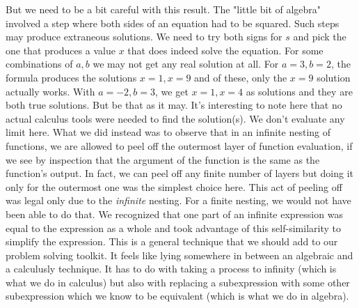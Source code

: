 But we need to be a bit careful with this result. The "little bit of algebra" involved a step where both sides of an equation had to be squared. Such steps may produce extraneous solutions. We need to try both signs for $s$ and pick the one that produces a value $x$ that does indeed solve the equation. For some combinations of $a,b$ we may not get any real solution at all. For $a = 3, b = 2$, the formula produces the solutions $x = 1, x = 9$ and of these, only the $x=9$ solution actually works. With $a = -2, b = 3$, we get $x = 1, x = 4$ as solutions and they are both true solutions. But be that as it may. It's interesting to note here that no actual calculus tools were needed to find the solution(s). We don't evaluate any limit here. What we did instead was to observe that in an infinite nesting of functions, we are allowed to peel off the outermost layer of function evaluation, if we see by inspection that the argument of the function is the same as the function's output. In fact, we can peel off any finite number of layers but doing it only for the outermost one was the simplest choice here. This act of peeling off was legal only due to the \emph{infinite} nesting. For a finite nesting, we would not have been able to do that. We recognized that one part of an infinite expression was equal to the expression as a whole and took advantage of this self-similarity to simplify the expression. This is a general technique that we should add to our problem solving toolkit. It feels like lying somewhere in between an algebraic and a calculusly technique. It has to do with taking a process to infinity (which is what we do in calculus) but also with replacing a subexpression with some other subexpression which we know to be equivalent (which is what we do in algebra).






